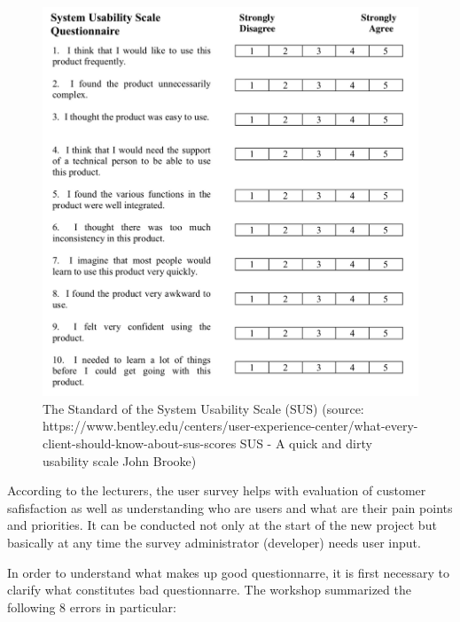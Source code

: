 \documentclass[a4paper,10pt,twoside]{article}
\begin{document}
\vspace{0.3cm}
\begin{figure}[hbt!] 
\begin{center}
\includegraphics[width=14cm]{../pictures/sus.png} 
\caption[The Standard of the System Usability Scale (SUS) ]{The Standard of the System Usability Scale (SUS) (source: https://www.bentley.edu/centers/user-experience-center/what-every-client-should-know-about-sus-scores SUS - A quick and dirty usability scale John Brooke)}
\label{fig:sus}
\end{center}
\end{figure}

\noindent According to the lecturers, the user survey helps with evaluation of customer safisfaction as well as understanding who are users and what are their pain points and priorities. It can be conducted not only at the start of the new project but basically at any time the survey administrator (developer) needs user input. 

In order to understand what makes up good questionnarre, it is first necessary to clarify what constitutes bad questionnarre. The workshop summarized the following 8 errors in particular:
\end{document}
